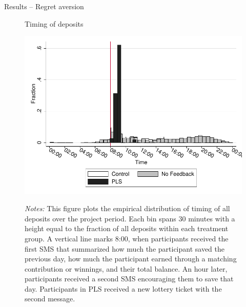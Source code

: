 \documentclass[aspectratio=169]{beamer}
\begin{document}
\begin{frame}{Results -- Regret aversion}

		\begin{figure}[ht]
		\centering
		\caption{Timing of deposits}
		\includegraphics[height=0.8\textheight]{../../figures/hist-deposits.pdf}
		\label{fig:hist-deposits}
		\caption*{\footnotesize \emph{Notes:} This figure plots the empirical distribution of timing of all deposits over the project period. Each bin spans 30 minutes with a height equal to the fraction of all deposits within each treatment group. A vertical line marks 8:00, when participants received the first SMS that summarized how much the participant saved the previous day, how much the participant earned through a matching contribution or winnings, and their total balance. An hour later, participants received a second SMS encouraging them to save that day. Participants in PLS received a new lottery ticket with the second message.}
		\end{figure}


\end{frame}

	
	

\end{document}
